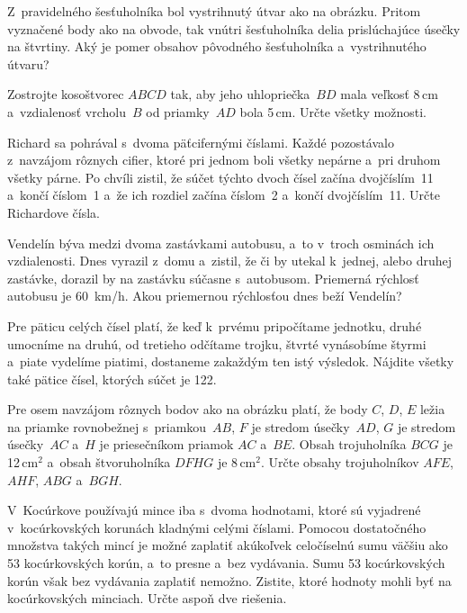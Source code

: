 {%
Z~pravidelného šesťuholníka bol vystrihnutý útvar ako na obrázku.
Pritom vyznačené body ako na obvode, tak vnútri šesťuholníka delia prislúchajúce úsečky na štvrtiny.
Aký je pomer obsahov pôvodného šesťuholníka a~vystrihnutého útvaru?
%
}

{%
Zostrojte kosoštvorec $ABCD$ tak, aby jeho uhlopriečka~$BD$ mala veľkosť 8\,cm a~vzdialenosť vrcholu~$B$ od priamky~$AD$ bola 5\,cm.
Určte všetky možnosti.
}

{%
Richard sa pohrával s~dvoma päťcifernými číslami.
Každé pozostávalo z~navzájom rôznych cifier, ktoré pri jednom boli všetky nepárne a~pri druhom všetky párne.
Po chvíli zistil, že súčet týchto dvoch čísel začína dvojčíslím~11 a~končí číslom~1 a~že ich rozdiel začína číslom~2 a~končí dvojčíslím~11.
Určte Richardove čísla.
}

{%
Vendelín býva medzi dvoma zastávkami autobusu, a~to v~troch osminách ich vzdialenosti.
Dnes vyrazil z~domu a~zistil, že či by utekal k~jednej, alebo druhej zastávke, dorazil by na zastávku súčasne s~autobusom.
Priemerná rýchlosť autobusu je 60~km/h. Akou priemernou rýchlosťou dnes beží Vendelín?
}

{%
Pre päticu celých čísel platí, že keď k~prvému pripočítame jednotku, druhé umocníme na druhú, od tretieho odčítame trojku, štvrté vynásobíme štyrmi a~piate vydelíme piatimi, dostaneme zakaždým ten istý výsledok.
Nájdite všetky také pätice čísel, ktorých súčet je 122.
}

{%
Pre osem navzájom rôznych bodov ako na obrázku platí, že body $C$, $D$, $E$ ležia na priamke rovnobežnej s~priamkou~$AB$, $F$ je stredom úsečky~$AD$, $G$ je stredom úsečky~$AC$ a~$H$ je priesečníkom priamok $AC$ a~$BE$.
Obsah trojuholníka $BCG$ je 12\,cm$^2$ a~obsah štvoruholníka $DFHG$ je 8\,cm$^2$.
Určte obsahy trojuholníkov $AFE$, $AHF$, $ABG$ a~$BGH$.
%
}

{%
V~Kocúrkove používajú mince iba s~dvoma hodnotami, ktoré sú vyjadrené v~kocúrkovských korunách kladnými celými číslami.
Pomocou dostatočného množstva takých mincí je možné zaplatiť akúkoľvek celočíselnú sumu väčšiu ako 53 kocúrkovských korún, a~to presne a~bez vydávania. Sumu 53 kocúrkovských korún však bez vydávania zaplatiť nemožno.
Zistite, ktoré hodnoty mohli byť na kocúrkovských minciach.
Určte aspoň dve riešenia.
}

